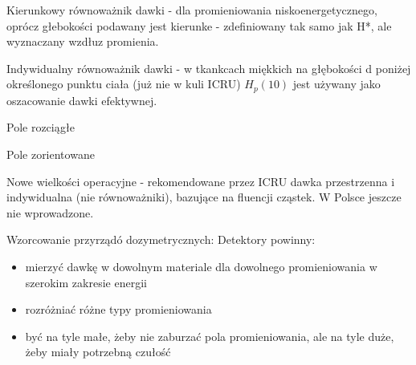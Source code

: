 \documentclass{article}
\begin{document}
Kierunkowy równoważnik dawki - dla promieniowania niskoenergetycznego, oprócz głebokości podawany jest kierunke - zdefiniowany tak samo jak H*, ale wyznaczany wzdłuz promienia.

Indywidualny równoważnik dawki - w tkankcach miękkich na głębokości d poniżej określonego punktu ciała (już nie w kuli ICRU) $H_p(10)$ jest używany jako oszacowanie dawki efektywnej.

Pole rozciągłe

Pole zorientowane

Nowe wielkości operacyjne - rekomendowane przez ICRU dawka przestrzenna i indywidualna (nie równoważniki), bazujące na fluencji cząstek. W Polsce jeszcze nie wprowadzone.

Wzorcowanie przyrządó dozymetrycznych:
Detektory powinny:
\begin{itemize}
    \item mierzyć dawkę w dowolnym materiale dla dowolnego promieniowania w szerokim zakresie energii
    \item rozróżniać różne typy promieniowania
    \item być na tyle małe, żeby nie zaburzać pola promieniowania, ale na tyle duże, żeby miały potrzebną czułość
\end{itemize}
\end{document}
